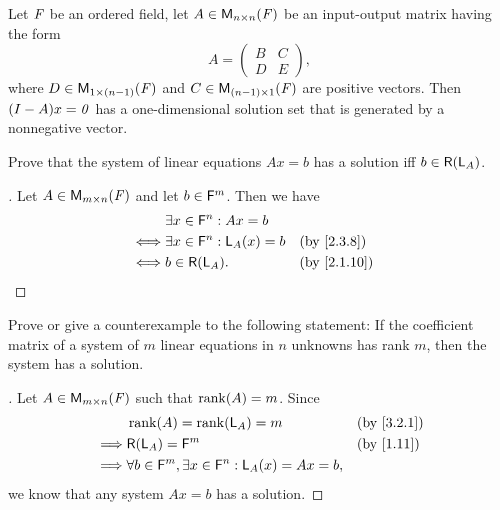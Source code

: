 \begin{thm}\label{3.12}
	Let \(\mathit{F}\) be an ordered field, let \(A \in \ms[n][n][\F]\) be an input-output matrix having the form
	\[
		A = \begin{pmatrix}
			B & C \\
			D & E
		\end{pmatrix},
	\]
	where \(D \in \ms[1][(n - 1)][\F]\) and \(C \in \ms[(n - 1)][1][\F]\) are positive vectors.
	Then \((I - A)x = \mathit{0}\) has a one-dimensional solution set that is generated by a nonnegative vector.
\end{thm}

\exercisesection

\setcounter{ex}{8}
\begin{ex}\label{ex:3.3.9}
	Prove that the system of linear equations \(Ax = b\) has a solution iff \(b \in \rg{\L_A}\).
\end{ex}

\begin{proof}[]
	Let \(A \in \ms\) and let \(b \in \mathsf{F}^m\).
	Then we have
	\begin{align*}
		     & \exists x \in \vs{F}^n : Ax = b                       \\
		\iff & \exists x \in \vs{F}^n : \L_A(x) = b &  & \by{2.3.8}  \\
		\iff & b \in \rg{\L_A}.                     &  & \by{2.1.10}
	\end{align*}
\end{proof}

\begin{ex}\label{ex:3.3.10}
	Prove or give a counterexample to the following statement:
	If the coefficient matrix of a system of \(m\) linear equations in \(n\) unknowns has rank \(m\), then the system has a solution.
\end{ex}

\begin{proof}[]
	Let \(A \in \ms\) such that \(\rk{A} = m\).
	Since
	\begin{align*}
		         & \rk{A} = \rk{\L_A} = m                                             &  & \by{3.2.1} \\
		\implies & \rg{\L_A} = \vs{F}^m                                               &  & \by{1.11}  \\
		\implies & \forall b \in \vs{F}^m, \exists x \in \vs{F}^n : \L_A(x) = Ax = b,
	\end{align*}
	we know that any system \(Ax = b\) has a solution.
\end{proof}
